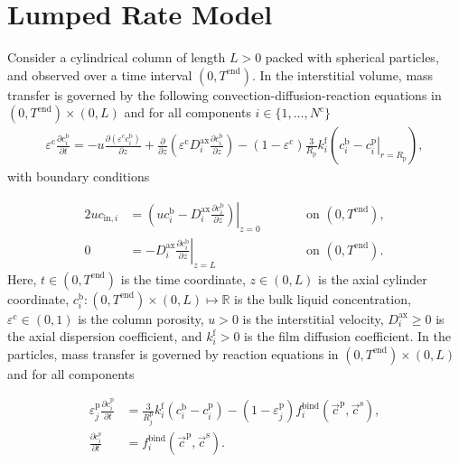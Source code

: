 \documentclass{article}
\begin{document}
\section*{Lumped Rate Model}
Consider a cylindrical column of length $L > 0$ packed with spherical particles, and observed over a time interval $(0, T^{\mathrm{end}})$.
In the interstitial volume, mass transfer is governed by the following convection-diffusion-reaction equations in $(0, T^\mathrm{end})\times (0, L)$ and for all components $i\in\{1, \dots, N^{\mathrm{c}} \}$
\begin{align}
\varepsilon^{\mathrm{c}} \frac{\partial c^{\mathrm{b}}_i}{\partial t} = - u \frac{\partial \left( \varepsilon^{\mathrm{c}} c^{\mathrm{b}}_i \right)}{\partial z} + \frac{\partial}{\partial z} \left( \varepsilon^{\mathrm{c}} D^{\mathrm{ax}}_{i} \frac{\partial c^{\mathrm{b}}_i}{\partial z} \right)- \left(1 - \varepsilon^{\mathrm{c}} \right) \frac{3}{R_{\mathrm{p}}} k^{\mathrm{f}}_{i} \left(c^{\mathrm{b}}_i - \left. c^{\mathrm{p}}_{i} \right|_{r = R_{\mathrm{p}}} \right),
\end{align}
with boundary conditions

\begin{alignat}{2}
u c_{\mathrm{in},i} &= \left.\left( u c^{\mathrm{b}}_i - D^{\mathrm{ax}}_{i} \frac{\partial c^{\mathrm{b}}_i}{\partial z}\right)\right|_{z=0} & &\qquad\text{on }(0, T^{\mathrm{end}}),\\
               0 &= - D^{\mathrm{ax}}_{i} \left. \frac{\partial c^{\mathrm{b}}_i}{\partial z} \right|_{z=L} & &\qquad\text{on }(0, T^{\mathrm{end}}).
\end{alignat}
Here, $t\in (0, T^{\mathrm{end}})$ is the time coordinate, $z\in (0, L)$ is the axial cylinder coordinate, $c^{\mathrm{b}}_i\colon (0, T^\mathrm{end})\times (0, L) \mapsto \mathbb{R}$ is the bulk liquid concentration, $\varepsilon^{\mathrm{c}}\in (0, 1)$ is the column porosity, $u> 0$ is the interstitial velocity, $D^\mathrm{ax}_i\geq 0$ is the axial dispersion coefficient, and $k^\mathrm{f}_{i}> 0$ is the film diffusion coefficient.
In the particles, mass transfer is governed by reaction equations in $ (0, T^\mathrm{end}) \times (0, L)$ and for all components

\begin{align}

          \varepsilon^{\mathrm{p}}_{j}\frac{\partial c^{\mathrm{p}}_{i}}{\partial t} 
          &=\frac{3}{R^{\mathrm{p}}_{j}} k^\mathrm{f}_{i} \left( c^{\mathrm{b}}_{i} - c^{\mathrm{p}}_{i} \right) - \left( 1 - \varepsilon^{\mathrm{p}}_{j} \right) f^{\mathrm{bind}}_{i} \left( \vec{c}^{\mathrm{p}}, \vec{c}^{\mathrm{s}} \right) ,\\

          \frac{\partial c^{\mathrm{s}}_{i}}{\partial t}
          &= f^{\mathrm{bind}}_{i}\left( \vec{c}^{\mathrm{p}}, \vec{c}^{\mathrm{s}} \right).
\end{align}
\end{document}
